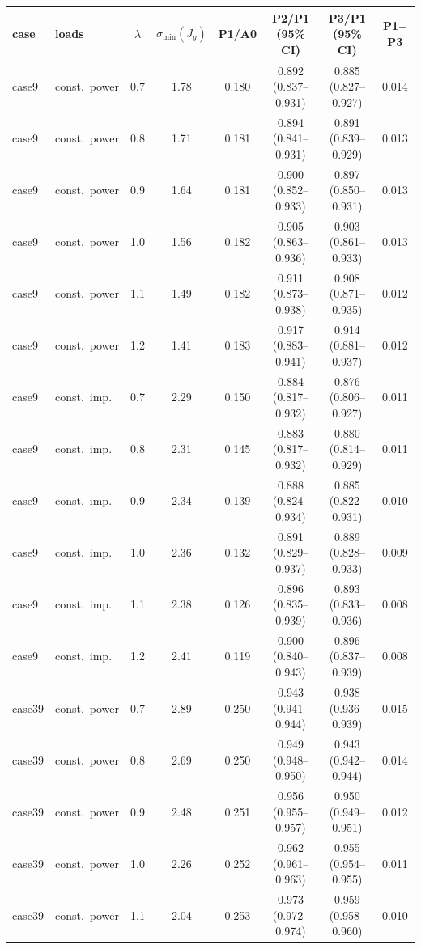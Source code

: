 \begin{longtable}{llcccccc}
\toprule case & loads & $\lambda$ & $\sigma_{\min}(J_g)$ & P1/A0 & P2/P1 (95\% CI) & P3/P1 (95\% CI) & P1$-$P3\\\midrule\endhead
case9 & const.\ power & 0.7 & 1.78 & 0.180 & 0.892 (0.837--0.931) & 0.885 (0.827--0.927) & 0.014\\
case9 & const.\ power & 0.8 & 1.71 & 0.181 & 0.894 (0.841--0.931) & 0.891 (0.839--0.929) & 0.013\\
case9 & const.\ power & 0.9 & 1.64 & 0.181 & 0.900 (0.852--0.933) & 0.897 (0.850--0.931) & 0.013\\
case9 & const.\ power & 1.0 & 1.56 & 0.182 & 0.905 (0.863--0.936) & 0.903 (0.861--0.933) & 0.013\\
case9 & const.\ power & 1.1 & 1.49 & 0.182 & 0.911 (0.873--0.938) & 0.908 (0.871--0.935) & 0.012\\
case9 & const.\ power & 1.2 & 1.41 & 0.183 & 0.917 (0.883--0.941) & 0.914 (0.881--0.937) & 0.012\\
case9 & const.\ imp. & 0.7 & 2.29 & 0.150 & 0.884 (0.817--0.932) & 0.876 (0.806--0.927) & 0.011\\
case9 & const.\ imp. & 0.8 & 2.31 & 0.145 & 0.883 (0.817--0.932) & 0.880 (0.814--0.929) & 0.011\\
case9 & const.\ imp. & 0.9 & 2.34 & 0.139 & 0.888 (0.824--0.934) & 0.885 (0.822--0.931) & 0.010\\
case9 & const.\ imp. & 1.0 & 2.36 & 0.132 & 0.891 (0.829--0.937) & 0.889 (0.828--0.933) & 0.009\\
case9 & const.\ imp. & 1.1 & 2.38 & 0.126 & 0.896 (0.835--0.939) & 0.893 (0.833--0.936) & 0.008\\
case9 & const.\ imp. & 1.2 & 2.41 & 0.119 & 0.900 (0.840--0.943) & 0.896 (0.837--0.939) & 0.008\\
case39 & const.\ power & 0.7 & 2.89 & 0.250 & 0.943 (0.941--0.944) & 0.938 (0.936--0.939) & 0.015\\
case39 & const.\ power & 0.8 & 2.69 & 0.250 & 0.949 (0.948--0.950) & 0.943 (0.942--0.944) & 0.014\\
case39 & const.\ power & 0.9 & 2.48 & 0.251 & 0.956 (0.955--0.957) & 0.950 (0.949--0.951) & 0.012\\
case39 & const.\ power & 1.0 & 2.26 & 0.252 & 0.962 (0.961--0.963) & 0.955 (0.954--0.955) & 0.011\\
case39 & const.\ power & 1.1 & 2.04 & 0.253 & 0.973 (0.972--0.974) & 0.959 (0.958--0.960) & 0.010\\

\end{longtable}
